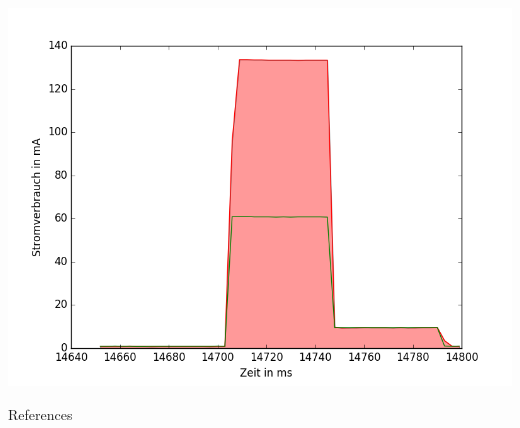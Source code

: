 \documentclass[18pt]{beamer}
\begin{document}
\begin{frame}
	\begin{minipage}[c][\textheight][c]{\textwidth}
		\centering
		\includegraphics[height=0.95\textheight]{plots/lora235send.png}
	\end{minipage}
\end{frame}

\appendix
\beginbackup

\begin{frame}[allowframebreaks]{References}
\printbibliography
\end{frame}

\backupend
\end{document}
